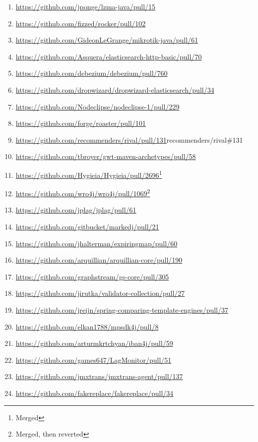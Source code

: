 \begin{enumerate}[topsep=0pt,itemsep=-1ex,partopsep=1ex,parsep=1ex]

\item \url{https://github.com/jponge/lzma-java/pull/15}
\item \url{https://github.com/fizzed/rocker/pull/102}
\item \url{https://github.com/GideonLeGrange/mikrotik-java/pull/61}
\item \url{https://github.com/Asquera/elasticsearch-http-basic/pull/70}
\item \url{https://github.com/debezium/debezium/pull/760}	
\item \url{https://github.com/dropwizard/dropwizard-elasticsearch/pull/34}
\item \url{https://github.com/Nodeclipse/nodeclipse-1/pull/229}	
\item \url{https://github.com/forge/roaster/pull/101}	
\item \url{https://github.com/recommenders/rival/pull/131}{recommenders/rival\#131}
\item \url{https://github.com/tbroyer/gwt-maven-archetypes/pull/58}
\item \url{https://github.com/Hygieia/Hygieia/pull/2696}\footnote[2]{Merged}
\item \url{https://github.com/wro4j/wro4j/pull/1069}\footnote[8]{Merged, then reverted}
\item \url{https://github.com/jplag/jplag/pull/61}
\item \url{https://github.com/gitbucket/markedj/pull/21}	
\item \url{https://github.com/jhalterman/expiringmap/pull/60}		
\item \url{https://github.com/arquillian/arquillian-core/pull/190}
\item \url{https://github.com/graphstream/gs-core/pull/305}
\item \url{https://github.com/jirutka/validator-collection/pull/27}
\item \url{https://github.com/jreijn/spring-comparing-template-engines/pull/37}
\item \url{https://github.com/elkan1788/mpsdk4j/pull/8}		
\item \url{https://github.com/arturmkrtchyan/iban4j/pull/59}	
\item \url{https://github.com/games647/LagMonitor/pull/51}	
\item \url{https://github.com/jmxtrans/jmxtrans-agent/pull/137}	
\item \url{https://github.com/fakereplace/fakereplace/pull/34}		

\end{enumerate}
